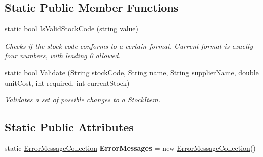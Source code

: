 \subsection*{Static Public Member Functions}
\begin{DoxyCompactItemize}
\item 
static bool \hyperlink{class_application_logic_1_1_model_1_1_stock_item_ac140618820a552685d321598ff7f6a7b}{IsValidStockCode} (string value)
\begin{DoxyCompactList}\small\item\em Checks if the stock code conforms to a certain format. Current format is exactly four numbers, with leading 0 allowed. \item\end{DoxyCompactList}\item 
static bool \hyperlink{class_application_logic_1_1_model_1_1_stock_item_a59c86a35a73cead183c2c241b89eb45b}{Validate} (String stockCode, String name, String supplierName, double unitCost, int required, int currentStock)
\begin{DoxyCompactList}\small\item\em Validates a set of possible changes to a \hyperlink{class_application_logic_1_1_model_1_1_stock_item}{StockItem}. \item\end{DoxyCompactList}\end{DoxyCompactItemize}
\subsection*{Static Public Attributes}
\begin{DoxyCompactItemize}
\item 
\hypertarget{class_application_logic_1_1_model_1_1_stock_item_a8972b74cb26b3f7d5614b9aa1f4914a2}{
static \hyperlink{class_application_logic_1_1_model_1_1_error_message_collection}{ErrorMessageCollection} {\bfseries ErrorMessages} = new \hyperlink{class_application_logic_1_1_model_1_1_error_message_collection}{ErrorMessageCollection}()}
\label{class_application_logic_1_1_model_1_1_stock_item_a8972b74cb26b3f7d5614b9aa1f4914a2}

\end{DoxyCompactItemize}
